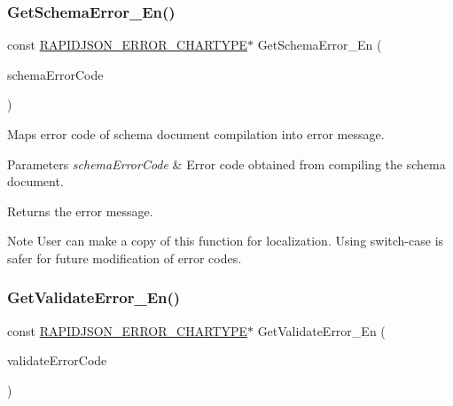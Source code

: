 \subsubsection{\texorpdfstring{Get\+Schema\+Error\+\_\+\+En()}{GetSchemaError\_En()}}
{\footnotesize\ttfamily const \hyperlink{group__RAPIDJSON__ERRORS_ga7e4636fd48d0148f102b8a13f0539d8c}{R\+A\+P\+I\+D\+J\+S\+O\+N\+\_\+\+E\+R\+R\+O\+R\+\_\+\+C\+H\+A\+R\+T\+Y\+PE}$\ast$ Get\+Schema\+Error\+\_\+\+En (\begin{DoxyParamCaption}\item[{\hyperlink{group__RAPIDJSON__ERRORS_ga64f496d2cee8c9673f3105ec6008f290}{Schema\+Error\+Code}}]{schema\+Error\+Code }\end{DoxyParamCaption})\hspace{0.3cm}{\ttfamily [inline]}}



Maps error code of schema document compilation into error message. 


\begin{DoxyParams}{Parameters}
{\em schema\+Error\+Code} & Error code obtained from compiling the schema document. \\
\hline
\end{DoxyParams}
\begin{DoxyReturn}{Returns}
the error message. 
\end{DoxyReturn}
\begin{DoxyNote}{Note}
User can make a copy of this function for localization. Using switch-\/case is safer for future modification of error codes. 
\end{DoxyNote}
\mbox{\label{group__RAPIDJSON__ERRORS_gade9d7778693290f23a627630c73e6edf}} 
\subsubsection{\texorpdfstring{Get\+Validate\+Error\+\_\+\+En()}{GetValidateError\_En()}}
{\footnotesize\ttfamily const \hyperlink{group__RAPIDJSON__ERRORS_ga7e4636fd48d0148f102b8a13f0539d8c}{R\+A\+P\+I\+D\+J\+S\+O\+N\+\_\+\+E\+R\+R\+O\+R\+\_\+\+C\+H\+A\+R\+T\+Y\+PE}$\ast$ Get\+Validate\+Error\+\_\+\+En (\begin{DoxyParamCaption}\item[{\hyperlink{group__RAPIDJSON__ERRORS_ga2e1f88f94a5d9a6817a5de0ed2f0105a}{Validate\+Error\+Code}}]{validate\+Error\+Code }\end{DoxyParamCaption})\hspace{0.3cm}{\ttfamily [inline]}}



